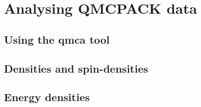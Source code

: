 \chapter{Analysing QMCPACK data}
\label{chap:analysing}

\section{Using the qmca tool}
\label{sec:qma}

\section{Densities and spin-densities}
\label{sec:densities}

\section{Energy densities}
\label{sec:energydensities}


